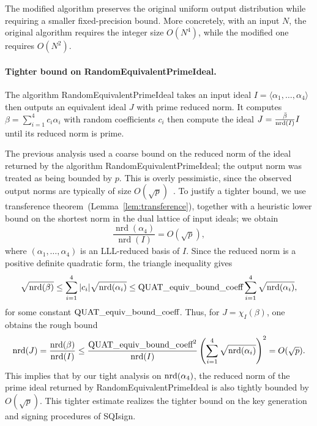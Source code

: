 The modified algorithm preserves the original uniform output distribution while requiring a smaller fixed-precision bound.
More concretely, with an input $N$, the original algorithm requires the integer size $O(N^4)$, while the modified one requires  $O(N^2)$.

\paragraph{Tighter bound on \textsf{RandomEquivalentPrimeIdeal}.}
The algorithm \textsf{RandomEquivalentPrimeIdeal} takes an input ideal $I=\langle \alpha_1,\dots,\alpha_4 \rangle$ then outputs an equivalent ideal $J$ with prime reduced norm.
It computes $\beta=\sum_{i=1}^4 c_i\alpha_i$ with random coefficients $c_i$ then compute the ideal $J = \frac{\bar{\beta}}{\mathrm{nrd}(I)}I$ until its reduced norm is prime.

The previous analysis used a coarse bound on the reduced norm of the ideal returned by the algorithm \textsf{RandomEquivalentPrimeIdeal};
the output norm was treated as being bounded by $p$.
This is overly pessimistic, since the observed output norms are typically of size $O(\sqrt{p})$~\cite{KLPT14}.
To justify a tighter bound, we use transference theorem~(Lemma~\ref{lem:transference}), together with a heuristic lower bound on the shortest norm in the dual lattice of input ideals;
we obtain
\[
    \frac{\operatorname{nrd}(\alpha_4)}{\operatorname{nrd}(I)}
    = O(\sqrt{p}),
\]
where $(\alpha_1,\dots,\alpha_4)$ is an LLL-reduced basis of $I$.
Since the reduced norm is a positive definite quadratic form, the triangle inequality gives
\[
  \sqrt{\mathrm{nrd}(\beta)}
  \leq \sum_{i=1}^{4} |c_i|\sqrt{\mathrm{nrd}(\alpha_i)}
  \leq \text{QUAT\_equiv\_bound\_coeff}\sum_{i=1}^{4}\sqrt{\mathrm{nrd}(\alpha_i)},
\]
for some constant $\text{QUAT\_equiv\_bound\_coeff}$.
Thus, for $J=\chi_I(\beta)$, one obtains the rough bound
\[
  \mathrm{nrd}(J)
  = \frac{\mathrm{nrd}(\beta)}{\mathrm{nrd}(I)}
  \leq
  \frac{\text{QUAT\_equiv\_bound\_coeff}^2}{\mathrm{nrd}(I)}
  \left(\sum_{i=1}^{4}\sqrt{\mathrm{nrd}(\alpha_i)}\right)^2
  = O(\sqrt{p}).
\]
This implies that by our tight analysis on $\mathrm{nrd}(\alpha_4)$, the reduced norm of the prime ideal returned by \textsf{RandomEquivalentPrimeIdeal} is also tightly bounded by $O(\sqrt{p})$.
This tighter estimate realizes the tighter bound on the key generation and signing procedures of SQIsign.

